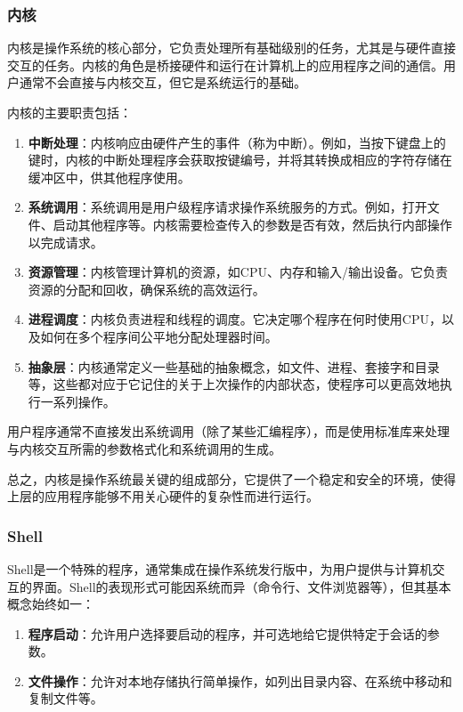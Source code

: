 \subsubsection{内核}

内核是操作系统的核心部分，它负责处理所有基础级别的任务，尤其是与硬件直接交互的任务。内核的角色是桥接硬件和运行在计算机上的应用程序之间的通信。用户通常不会直接与内核交互，但它是系统运行的基础。

内核的主要职责包括：

\begin{enumerate}
    \item \textbf{中断处理}：内核响应由硬件产生的事件（称为中断）。例如，当按下键盘上的键时，内核的中断处理程序会获取按键编号，并将其转换成相应的字符存储在缓冲区中，供其他程序使用。
    \item \textbf{系统调用}：系统调用是用户级程序请求操作系统服务的方式。例如，打开文件、启动其他程序等。内核需要检查传入的参数是否有效，然后执行内部操作以完成请求。
    \item \textbf{资源管理}：内核管理计算机的资源，如CPU、内存和输入/输出设备。它负责资源的分配和回收，确保系统的高效运行。
    \item \textbf{进程调度}：内核负责进程和线程的调度。它决定哪个程序在何时使用CPU，以及如何在多个程序间公平地分配处理器时间。
    \item \textbf{抽象层}：内核通常定义一些基础的抽象概念，如文件、进程、套接字和目录等，这些都对应于它记住的关于上次操作的内部状态，使程序可以更高效地执行一系列操作。
\end{enumerate}

用户程序通常不直接发出系统调用（除了某些汇编程序），而是使用标准库来处理与内核交互所需的参数格式化和系统调用的生成。

总之，内核是操作系统最关键的组成部分，它提供了一个稳定和安全的环境，使得上层的应用程序能够不用关心硬件的复杂性而进行运行。

\subsubsection{Shell}

Shell是一个特殊的程序，通常集成在操作系统发行版中，为用户提供与计算机交互的界面。Shell的表现形式可能因系统而异（命令行、文件浏览器等），但其基本概念始终如一：

\begin{enumerate}
    \item \textbf{程序启动}：允许用户选择要启动的程序，并可选地给它提供特定于会话的参数。
    \item \textbf{文件操作}：允许对本地存储执行简单操作，如列出目录内容、在系统中移动和复制文件等。
\end{enumerate}


